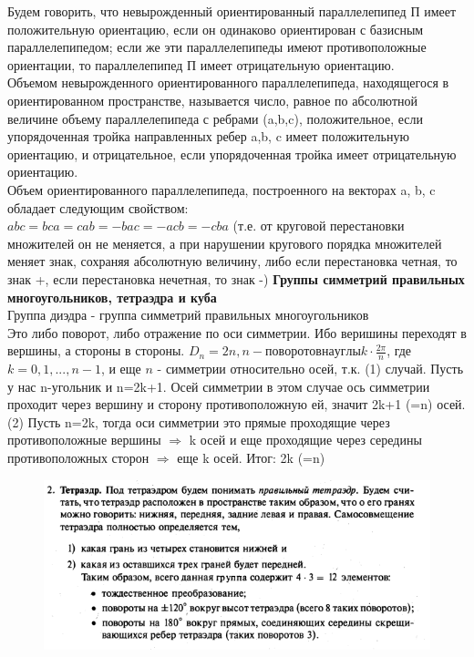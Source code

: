 \documentclass[12pt, oneside]{book}
\theoremstyle{definition}
\begin{document}
\begin{enumerate}
Будем говорить, что невырожденный ориентированный параллелепипед П имеет положительную ориентацию, если он одинаково ориентирован с базисным параллелепипедом; если же эти параллелепипеды имеют противоположные ориентации, то параллелепипед П имеет отрицательную ориентацию.\\
Объемом невырожденного ориентированного параллелепипеда, находящегося в ориентированном пространстве, называется число, равное по абсолютной величине объему параллелепипеда с ребрами (a,b,c), положительное, если упорядоченная тройка направленных ребер a,b, c имеет положительную ориентацию, и отрицательное, если упорядоченная тройка имеет отрицательную ориентацию.\\
Объем ориентированного параллелепипеда, построенного на векторах a, b, c обладает следующим свойством:\\
$abc = bca = cab = -bac = -acb = -cba$ (т.е. от круговой перестановки множителей он не меняется, а при нарушении кругового порядка множителей меняет знак, сохраняя абсолютную величину, либо если перестановка четная, то знак +, если перестановка нечетная, то знак -)
\textbf{Группы симметрий правильных многоугольников, тетраэдра и куба}\\
Группа диэдра - группа симметрий правильных многоугольников\\
Это либо поворот, либо отражение по оси симметрии. Ибо веришины переходят в вершины, а стороны в стороны.
$D_n = 2n, n - поворотов на углы k\cdot \frac{2\pi}{n}$, где $k = 0, 1, ..., n-1$, и еще $n$ - симметрии относительно осей, т.к. (1) случай. Пусть у нас n-угольник и n=2k+1. Осей симметрии в этом случае ось симметрии проходит через вершину и сторону противоположную ей, значит 2k+1 (=n) осей. (2) Пусть n=2k, тогда оси симметрии это прямые проходящие через противоположные вершины $\Rightarrow$ k осей и еще проходящие через середины противоположных сторон $\Rightarrow$ еще k осей. Итог: 2k (=n)\\
\begin{figure}[h!]
\centering
\includegraphics[scale=1.1]{4-6.PNG}

\end{figure}
\end{enumerate}
\end{document}
